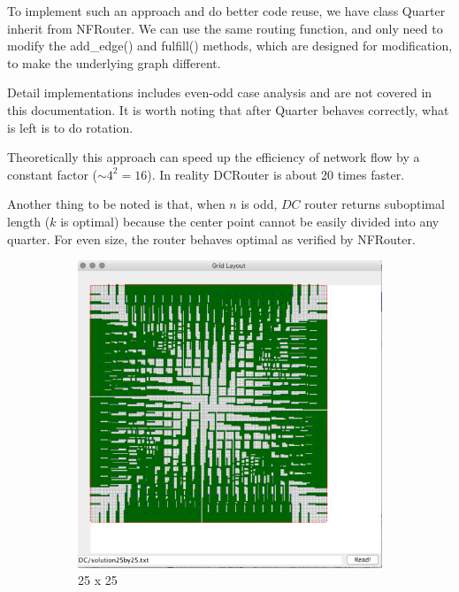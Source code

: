 \documentclass{article}
\begin{document}
\begin{spacing}{1.1}
    To implement such an approach and do better code reuse, we have class Quarter inherit from NFRouter. We can use the same routing function, and only need to modify the add\_edge() and fulfill() methods, which are designed for modification, to make the underlying graph different.

    Detail implementations includes even-odd case analysis and are not covered in this documentation. It is worth noting that after Quarter behaves correctly, what is left is to do rotation.

    Theoretically this approach can speed up the efficiency of network flow by a constant factor ($\sim 4^2 = 16$). In reality DCRouter is about 20 times faster.

    Another thing to be noted is that, when $n$ is odd, $DC$ router returns suboptimal length ($k$ is optimal) because the center point cannot be easily divided into any quarter. For even size, the router behaves optimal as verified by NFRouter.
    \begin{figure}[H]
        \centering
        \begin{subfigure}{0.3\textwidth}
            \includegraphics[width = \textwidth]{DC1.png}
            \caption{25 x 25}
        \end{subfigure}
        \begin{subfigure}{0.3\textwidth}

\end{subfigure}
\end{figure}
\end{spacing}
\end{document}
